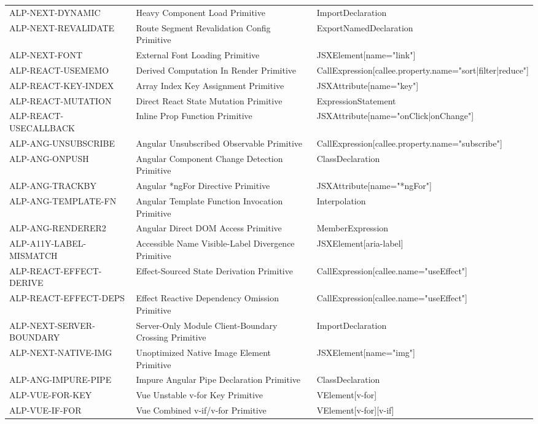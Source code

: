 \begin{table}[htbp]
\begin{tabular}{lll}
ALP-NEXT-DYNAMIC & Heavy Component Load Primitive & ImportDeclaration \\
ALP-NEXT-REVALIDATE & Route Segment Revalidation Config Primitive & ExportNamedDeclaration \\
ALP-NEXT-FONT & External Font Loading Primitive & JSXElement[name="link"] \\
ALP-REACT-USEMEMO & Derived Computation In Render Primitive & CallExpression[callee.property.name="sort|filter|reduce"] \\
ALP-REACT-KEY-INDEX & Array Index Key Assignment Primitive & JSXAttribute[name="key"] \\
ALP-REACT-MUTATION & Direct React State Mutation Primitive & ExpressionStatement \\
ALP-REACT-USECALLBACK & Inline Prop Function Primitive & JSXAttribute[name="onClick|onChange"] \\
ALP-ANG-UNSUBSCRIBE & Angular Unsubscribed Observable Primitive & CallExpression[callee.property.name="subscribe"] \\
ALP-ANG-ONPUSH & Angular Component Change Detection Primitive & ClassDeclaration \\
ALP-ANG-TRACKBY & Angular *ngFor Directive Primitive & JSXAttribute[name="*ngFor"] \\
ALP-ANG-TEMPLATE-FN & Angular Template Function Invocation Primitive & Interpolation \\
ALP-ANG-RENDERER2 & Angular Direct DOM Access Primitive & MemberExpression \\
ALP-A11Y-LABEL-MISMATCH & Accessible Name Visible-Label Divergence Primitive & JSXElement[aria-label] \\
ALP-REACT-EFFECT-DERIVE & Effect-Sourced State Derivation Primitive & CallExpression[callee.name="useEffect"] \\
ALP-REACT-EFFECT-DEPS & Effect Reactive Dependency Omission Primitive & CallExpression[callee.name="useEffect"] \\
ALP-NEXT-SERVER-BOUNDARY & Server-Only Module Client-Boundary Crossing Primitive & ImportDeclaration \\
ALP-NEXT-NATIVE-IMG & Unoptimized Native Image Element Primitive & JSXElement[name="img"] \\
ALP-ANG-IMPURE-PIPE & Impure Angular Pipe Declaration Primitive & ClassDeclaration \\
ALP-VUE-FOR-KEY & Vue Unstable v-for Key Primitive & VElement[v-for] \\
ALP-VUE-IF-FOR & Vue Combined v-if/v-for Primitive & VElement[v-for][v-if] \\

\end{tabular}
\end{table}
